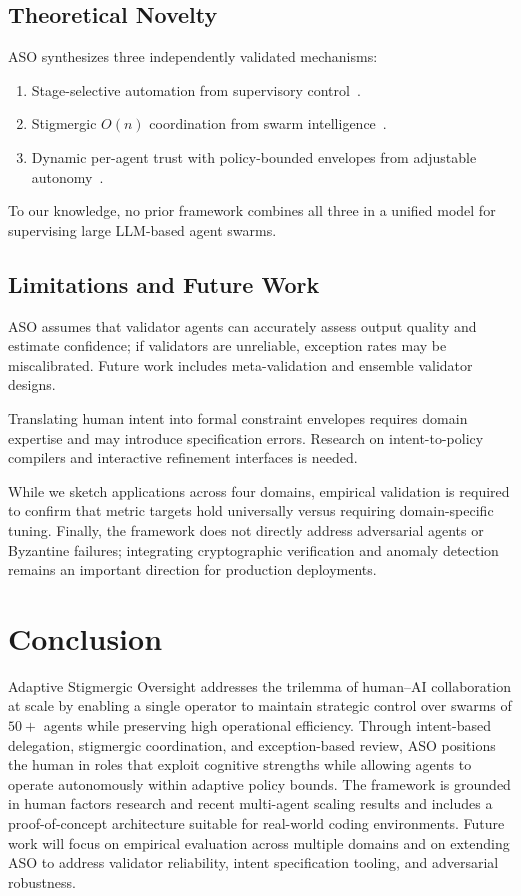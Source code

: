 \documentclass[11pt]{article}
\begin{document}
\subsection{Theoretical Novelty}

ASO synthesizes three independently validated mechanisms:
\begin{enumerate}[label=(\alph*),leftmargin=*]
    \item Stage-selective automation from supervisory control~\cite{parasuraman2000model}.
    \item Stigmergic $O(n)$ coordination from swarm intelligence~\cite{heylighen2016stigmergy,li2025swarmsys}.
    \item Dynamic per-agent trust with policy-bounded envelopes from adjustable autonomy~\cite{scerri2002adjustable,chen2025trust}.
\end{enumerate}
To our knowledge, no prior framework combines all three in a unified model for supervising large LLM-based agent swarms.

\subsection{Limitations and Future Work}

ASO assumes that validator agents can accurately assess output quality and estimate confidence; if validators are unreliable, exception rates may be miscalibrated. Future work includes meta-validation and ensemble validator designs.

Translating human intent into formal constraint envelopes requires domain expertise and may introduce specification errors. Research on intent-to-policy compilers and interactive refinement interfaces is needed.

While we sketch applications across four domains, empirical validation is required to confirm that metric targets hold universally versus requiring domain-specific tuning. Finally, the framework does not directly address adversarial agents or Byzantine failures; integrating cryptographic verification and anomaly detection remains an important direction for production deployments.

\section{Conclusion}

Adaptive Stigmergic Oversight addresses the trilemma of human--AI collaboration at scale by enabling a single operator to maintain strategic control over swarms of $50+$ agents while preserving high operational efficiency. Through intent-based delegation, stigmergic coordination, and exception-based review, ASO positions the human in roles that exploit cognitive strengths while allowing agents to operate autonomously within adaptive policy bounds. The framework is grounded in human factors research and recent multi-agent scaling results and includes a proof-of-concept architecture suitable for real-world coding environments. Future work will focus on empirical evaluation across multiple domains and on extending ASO to address validator reliability, intent specification tooling, and adversarial robustness.
\end{document}
